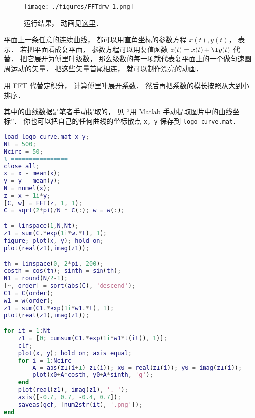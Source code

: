 
\begin{issues}
\issueDraft
\end{issues}


\begin{figure}[ht]
\centering
\texttt{[image: ./figures/FFTdrw\_1.png]}
\caption{运行结果， 动画见\href{https://wuli.wiki/apps/FFTplt.html}{这里}．} \label{FFTdrw_fig1}
\end{figure}


平面上一条任意的连续曲线， 都可以用直角坐标的参数方程 $x(t), y(t)$， 表示． 若把平面看成复平面， 参数方程可以用复值函数 $z(t) = x(t) + \I y(t)$ 代替． 把它展开为傅里叶级数， 那么级数的每一项就代表复平面上的一个做匀速圆周运动的矢量． 把这些矢量首尾相连， 就可以制作漂亮的动画．

用 FFT 代替定积分， 计算傅里叶展开系数． 然后再把系数的模长按照从大到小排序．

其中的曲线数据是笔者手动提取的， 见 “用 Matlab 手动提取图片中的曲线坐标”． 你也可以把自己的任何曲线的坐标散点 \verb|x, y| 保存到 \verb|logo_curve.mat|．

\begin{lstlisting}[language=matlab, caption=FFTplt]
% ==== 参数设置 ====
load logo_curve.mat x y;
Nt = 500;
Ncirc = 50;
% ================
close all;
x = x - mean(x);
y = y - mean(y);
N = numel(x);
z = x + 1i*y;
[C, w] = FFT(z, 1, 1);
C = sqrt(2*pi)/N * C(:); w = w(:);

t = linspace(1,N,Nt);
z1 = sum(C.*exp(1i*w.*t), 1);
figure; plot(x, y); hold on;
plot(real(z1),imag(z1));

th = linspace(0, 2*pi, 200);
costh = cos(th); sinth = sin(th);
N1 = round(N/2-1);
[~, order] = sort(abs(C), 'descend');
C1 = C(order);
w1 = w(order);
z1 = sum(C1.*exp(1i*w1.*t), 1);
plot(real(z1),imag(z1));

for it = 1:Nt
    z1 = [0; cumsum(C1.*exp(1i*w1*t(it)), 1)];
    clf;
    plot(x, y); hold on; axis equal;
    for i = 1:Ncirc
        A = abs(z1(i+1)-z1(i)); x0 = real(z1(i)); y0 = imag(z1(i));
        plot(x0+A*costh, y0+A*sinth, 'g');
    end
    plot(real(z1), imag(z1), '.-');
    axis([-0.7, 0.7, -0.4, 0.7]);
    saveas(gcf, [num2str(it), '.png']);
end
\end{lstlisting}
